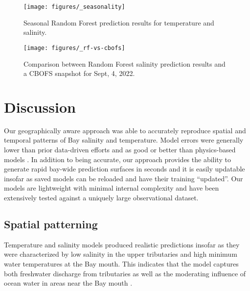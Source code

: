 \documentclass{article}
\begin{document}
\begin{figure}[ht!]
    \begin{center}
          \texttt{[image: figures/\_seasonality]}
          \caption{Seasonal Random Forest prediction results for temperature and salinity.}
    \end{center}    
\end{figure}

\begin{figure}[ht!]
    \begin{center}
          \texttt{[image: figures/\_rf-vs-cbofs]}
          \caption{Comparison between Random Forest salinity prediction results and a CBOFS snapshot for Sept, 4, 2022.}
    \end{center}    
\end{figure}

\section{Discussion}

Our geographically aware approach was able to accurately reproduce spatial and temporal patterns of Bay salinity and temperature. Model errors were generally lower than prior data-driven efforts and as good or better than physics-based models \citep{vogelAssessingSatelliteSea2016}. In addition to being accurate, our approach provides the ability to generate rapid bay-wide prediction surfaces in seconds and it is easily updatable insofar as saved models can be reloaded and have their training “updated”. Our models are lightweight with minimal internal complexity and have been extensively tested against a uniquely large observational dataset.

\subsection{Spatial patterning}

Temperature and salinity models produced realistic predictions insofar as they were characterized by low salinity in the upper tributaries and high minimum water temperatures at the Bay mouth. This indicates that the model captures both freshwater discharge from tributaries as well as the moderating influence of ocean water in areas near the Bay mouth \citep{dingSpatiotemporalPatternsWater2015}.
\end{document}
